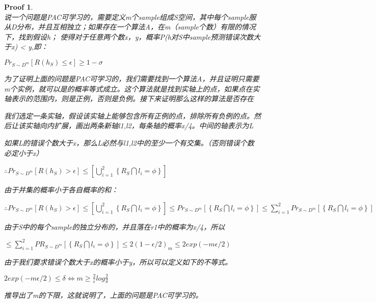 \documentclass[a4paper,UTF8]{article}
\numberwithin{equation}{section}
\newtheorem*{myProof}{Proof}
\begin{document}
\begin{myProof}~\\
	
	说一个问题是PAC可学习的，需要定义m个sample组成S空间，其中每个sample服从D分布，并且互相独立；如果存在一个算法A，在m（sample个数）有限的情况下，找到假设h；	使得对于任意两个数x，y，概率P(h对S中sample预测错误次数大于x) < y,即：
	
	
	$Pr_{S\sim D^{m}} \left [ R\left ( h_{S} \right )\leq \epsilon  \right ]\geq 1-\sigma$
	
	为了证明上面的问题是PAC可学习的，我们需要找到一个算法A，并且证明只需要m个实例，就可以是的概率等式成立。这个算法就是找到实轴上的点，如果点在实轴表示的范围内，则是正例，否则是负例。接下来证明那么这样的算法是否存在
	
	我们选定一条实轴，假设该实轴上能够包含所有正例的点，排除所有负例的点。然后让该实轴向内扩展，画出两条新轴l1,l2，每条轴的概率x/4。中间的轴表示为L
	
	如果L的错误个数大于x，那么L必然与l1,l2中的至少一个有交集。（否则错误个数必定小于x）
	
	$\therefore Pr_{S\sim D^{m}} \left [ R\left ( h_{S} \right )>  \epsilon  \right ]\leq  \left [ \bigcup_{i=1}^{2}\left\{ R_S\bigcap l_{i}=\phi \right\} \right ] $
	
	由于并集的概率小于各自概率的和：
	
$\therefore Pr_{S\sim D^{m}} \left [ R\left ( h_{S} \right )>  \epsilon  \right ]\leq  \left [ \bigcup_{i=1}^{2}\left\{ R_S\bigcap l_{i}=\phi \right\} \right ] \leq Pr_{S\sim D^{m}}\left [ \left\{ R_S\bigcap l_i=\phi \right\} \right ]\leq \sum_{i=1}^{2}Pr_{S \sim D^m}\left [ \left\{ R_S\bigcap l_i=\phi \right\} \right ]$

由于S中的每个sample的独立分布的，并且落在r1中的概率为x/4，所以

$\leq \sum_{i=1}^{2}PR_{S\sim D^m}\left [ \left\{ R_S\bigcap l_i = \phi \right\} \right ]\leq 2\left ( 1-\epsilon /2 \right )_m\leq 2exp \left(-m\epsilon /2\right)$


由于我们要求错误个数大于x的概率小于y，所以可以定义如下的不等式。

$2exp \left(-m\epsilon /2\right) \leq \delta \Leftrightarrow m\geq \frac{2}{\epsilon }log\frac{2}{\delta }$

推导出了m的下限，这就说明了，上面的问题是PAC可学习的。

\end{myProof}

\newpage
\end{document}
